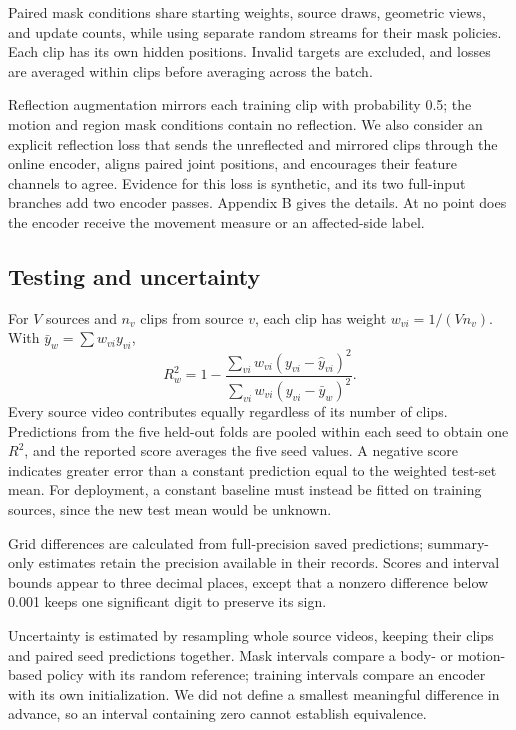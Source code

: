 \documentclass{article}
\begin{document}
Paired mask conditions share starting weights, source draws, geometric views, and update counts, while using separate random streams for their mask policies. Each clip has its own hidden positions. Invalid targets are excluded, and losses are averaged within clips before averaging across the batch.

Reflection augmentation mirrors each training clip with probability 0.5; the motion and region mask conditions contain no reflection. We also consider an explicit reflection loss that sends the unreflected and mirrored clips through the online encoder, aligns paired joint positions, and encourages their feature channels to agree. Evidence for this loss is synthetic, and its two full-input branches add two encoder passes. Appendix B gives the details. At no point does the encoder receive the movement measure or an affected-side label.

\subsection{Testing and uncertainty}\label{testing-and-uncertainty}

For \(V\) sources and \(n_v\) clips from source \(v\), each clip has weight \(w_{vi}=1/(Vn_v)\). With \(\bar y_w=\sum w_{vi}y_{vi}\), \[
R^2_w=1-\frac{\sum_{vi}w_{vi}(y_{vi}-\hat y_{vi})^2}
{\sum_{vi}w_{vi}(y_{vi}-\bar y_w)^2}.
\] Every source video contributes equally regardless of its number of clips. Predictions from the five held-out folds are pooled within each seed to obtain one \(R^2\), and the reported score averages the five seed values. A negative score indicates greater error than a constant prediction equal to the weighted test-set mean. For deployment, a constant baseline must instead be fitted on training sources, since the new test mean would be unknown.

Grid differences are calculated from full-precision saved predictions; summary-only estimates retain the precision available in their records. Scores and interval bounds appear to three decimal places, except that a nonzero difference below 0.001 keeps one significant digit to preserve its sign.

Uncertainty is estimated by resampling whole source videos, keeping their clips and paired seed predictions together. Mask intervals compare a body- or motion-based policy with its random reference; training intervals compare an encoder with its own initialization. We did not define a smallest meaningful difference in advance, so an interval containing zero cannot establish equivalence.
\end{document}
